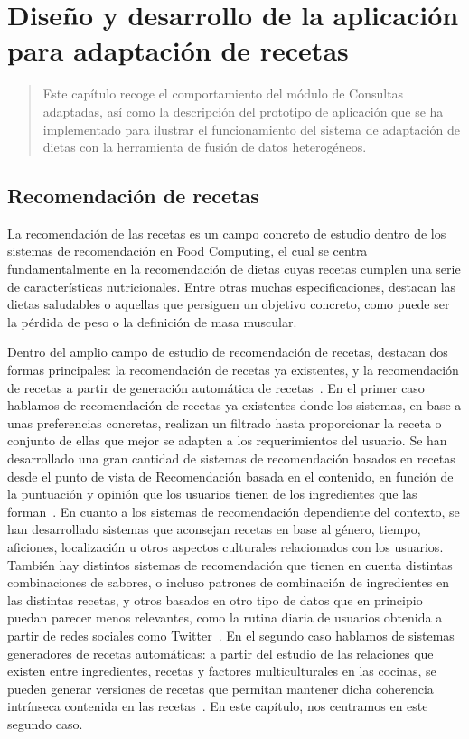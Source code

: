 \chapter[Diseño y desarrollo de la aplicación]{Diseño y desarrollo de la aplicación para adaptación de recetas}
\label{ch:Consultas_Adaptadas}

\begin{quote}
  Este capítulo recoge el comportamiento del módulo de Consultas adaptadas, así como la descripción del prototipo de aplicación que se ha implementado para ilustrar el funcionamiento del sistema de adaptación de dietas con la herramienta de fusión de datos heterogéneos.
\end{quote}


\section{Recomendación de recetas}

La recomendación de las recetas es un campo concreto de estudio dentro de los sistemas de recomendación en Food Computing, el cual se centra fundamentalmente en la recomendación de dietas cuyas recetas cumplen una serie de características nutricionales. Entre otras muchas especificaciones, destacan las dietas saludables o aquellas que persiguen un objetivo concreto, como puede ser la pérdida de peso o la definición de masa muscular.

Dentro del amplio campo de estudio de recomendación de recetas, destacan dos formas principales: la recomendación de recetas ya existentes, y la recomendación de recetas a partir de generación automática de recetas~\cite{chen2019eating}. En el primer caso hablamos de recomendación de recetas ya existentes donde los sistemas, en base a unas preferencias concretas, realizan un filtrado hasta proporcionar la receta o conjunto de ellas que mejor se adapten a los requerimientos del usuario. Se han desarrollado una gran cantidad de sistemas de recomendación basados en recetas desde el punto de vista de Recomendación basada en el contenido, en función de  la puntuación y opinión que los usuarios tienen de los ingredientes que las forman~\cite{Freyne:2010:IFP:1719970.1720021,a3e625bf40904a799c3b8e35929388b7}.
En cuanto a los sistemas de recomendación dependiente del contexto, se han desarrollado sistemas que aconsejan recetas en base al género, tiempo, aficiones, localización u otros aspectos culturales relacionados con los usuarios. También hay distintos sistemas de recomendación que tienen en cuenta distintas combinaciones de sabores, o incluso patrones de combinación de ingredientes en las distintas recetas, y otros basados en otro tipo de datos que en principio puedan parecer menos relevantes, como la rutina diaria de usuarios obtenida a partir de redes sociales como Twitter~\cite{Rokicki2016PlateAP}. En el segundo caso hablamos de sistemas generadores de recetas automáticas: a partir del estudio de las relaciones que existen entre ingredientes, recetas y factores multiculturales en las cocinas, se pueden generar versiones de recetas que permitan mantener dicha coherencia intrínseca contenida en las recetas~\cite{10.3389/fict.2018.00014}. En este capítulo, nos centramos en este segundo caso.


